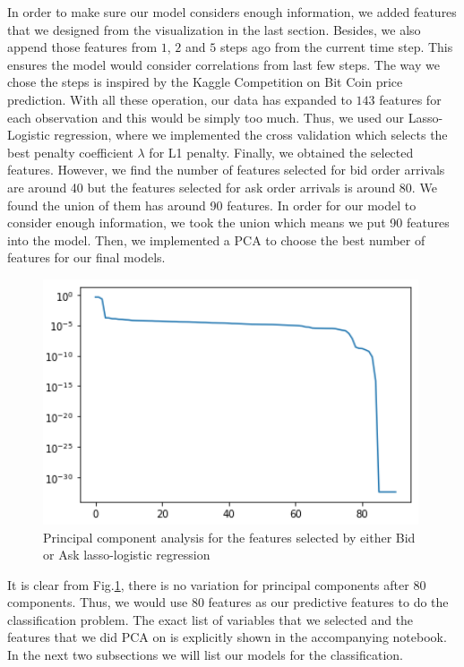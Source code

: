\documentclass[letterpaper,12pt]{article}
\numberwithin{equation}{section}
\begin{document}
In order to make sure our model considers enough information, we added features that we designed from the visualization in the last section. Besides, we also append those features from $1$, $2$ and $5$ steps ago from the current time step. This ensures the model would consider correlations from last few steps. The way we chose the steps is inspired by the Kaggle Competition on Bit Coin price prediction. With all these operation, our data has expanded to $143$ features for each observation and this would be simply too much. Thus, we used our Lasso-Logistic regression, where we implemented the cross validation which selects the best penalty coefficient $\lambda$ for L1 penalty. Finally, we obtained the selected features. However, we find the number of features selected for bid order arrivals are around 40 but the features selected for ask order arrivals is around 80. We found the union of them has around 90 features. In order for our model to consider enough information, we took the union which means we put 90 features into the model. Then, we implemented a PCA to choose the best number of features for our final models. 
\begin{figure}[H]
    \centering
    \includegraphics[scale = 0.6]{figs/PCA.png}
    \caption{Principal component analysis for the features selected by either Bid or Ask lasso-logistic regression }
    \label{sec4:fig:PCA}
\end{figure}
It is clear from Fig.\ref{sec4:fig:PCA}, there is no variation for principal components after 80 components. Thus, we would use 80 features as our predictive features to do the classification problem. The exact list of variables that we selected and the features that we did PCA on is explicitly shown in the accompanying notebook. In the next two subsections we will list our models for the classification. 
\end{document}
